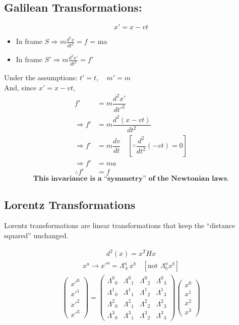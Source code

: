 \documentclass[14pt]{article} %
\begin{document}
\subsection*{Galilean Transformations:}
$$ x' = x - vt $$
\begin{itemize}
    \item In frame $S \Rightarrow m \frac{d^2x}{dt^2} = f$ = ma
    \item In frame $S' \Rightarrow m \frac{d^2x'}{dt^2} = f'$
\end{itemize}
Under the assumptions: \quad $t' = t, \quad m' = m$ \\
And, since $x' = x - vt$,
\begin{align*}
    f' &= m \dfrac{d^2 x'}{dt'^2} \\
    \Rightarrow f' &= m \dfrac{d^2 (x - vt)}{dt^2} \\
    \Rightarrow f' &= m \dfrac{dv}{dt} \quad [\because\dfrac{d^2}{dt^2}(-vt) = 0] \\
    \Rightarrow f' &= ma \\
    \therefore f'&= f
\end{align*}
$$ \textbf{This invariance is a ``symmetry'' of the Newtonian laws.} $$
\subsection*{Lorentz Transformations}
Lorentz transformations are linear transformations that keep the ``distance squared'' unchanged.

\begin{align*}
d^2(x) = x^T H x
\end{align*}
\begin{align*}
x^a \rightarrow x'^a = \Lambda^a_{~b}~x^b \quad [\text{not } \Lambda^a_{b} x^b]
\end{align*}
\begin{align*}
\begin{pmatrix}
x'^0 \\
x'^1 \\
x'^2 \\
x'^3
\end{pmatrix}
=
\begin{pmatrix}
\Lambda^0{}_0 & \Lambda^0{}_1 & \Lambda^0{}_2 & \Lambda^0{}_3 \\
\Lambda^1{}_0 & \Lambda^1{}_1 & \Lambda^1{}_2 & \Lambda^1{}_3 \\
\Lambda^2{}_0 & \Lambda^2{}_1 & \Lambda^2{}_2 & \Lambda^2{}_3 \\
\Lambda^3{}_0 & \Lambda^3{}_1 & \Lambda^3{}_2 & \Lambda^3{}_3
\end{pmatrix}
\begin{pmatrix}
x^0 \\
x^1 \\
x^2 \\
x^3
\end{pmatrix}
\end{align*}
\end{document}
